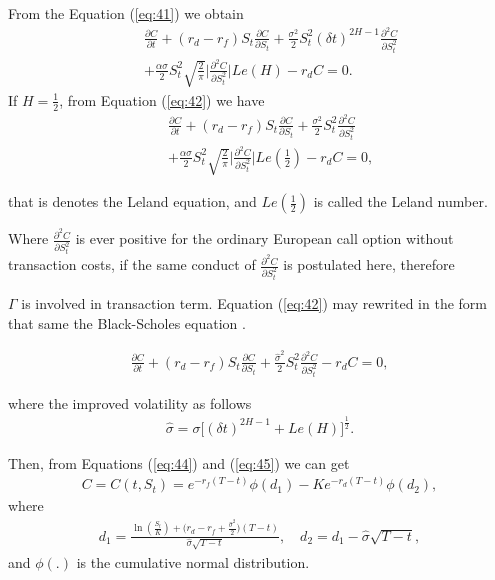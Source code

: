 \documentclass[a4paper,11pt]{amsart}
\numberwithin{equation}{section}
\theoremstyle{definition}
\theoremstyle{plain}
\theoremstyle{definition}
\newcommand{\1}{\mathbf{1}}
\begin{document}
From the Equation (\ref{eq:41}) we obtain
\begin{eqnarray}
&&\frac{\partial C}{\partial t}+(r_d-r_f)S_t\frac{\partial C}{\partial S_t}+\frac{\sigma^2}{2}S_t^2(\delta t)^{2H-1}\frac{\partial^2 C}{\partial S_t^2}\nonumber\\
&&+\frac{\alpha \sigma}{2}S_t^2\sqrt{\frac{2}{\pi}}\Big|\frac{\partial^2C}{\partial S_t^2}\Big|Le(H)-r_dC=0.
\label{eq:42}
\end{eqnarray}
If $H=\frac{1}{2}$, from Equation  (\ref{eq:42}) we have
\begin{eqnarray}
&&\frac{\partial C}{\partial t}+(r_d-r_f)S_t\frac{\partial C}{\partial S_t}+\frac{\sigma^2}{2}S_t^2\frac{\partial^2 C}{\partial S_t^2}\nonumber\\
&&+\frac{\alpha \sigma}{2}S_t^2\sqrt{\frac{2}{\pi}}\Big|\frac{\partial^2C}{\partial S_t^2}\Big|Le(\frac{1}{2})-r_dC=0,
\label{eq:43}
\end{eqnarray}

that is denotes the Leland equation, and $Le(\frac{1}{2})$ is called the Leland number.

Where $\frac{\partial^2C}{\partial S_t^2}$ is ever positive for the ordinary European call option without transaction costs, if  the same conduct of $\frac{\partial^2C}{\partial S_t^2}$ is postulated here, therefore


$\Gamma$ is involved in transaction term. Equation (\ref{eq:42}) may rewrited in the form that  same  the Black-Scholes equation \cite{black}.

\begin{eqnarray}
\frac{\partial C}{\partial t}+(r_d-r_f)S_t\frac{\partial C}{\partial S_t}+\frac{\widehat{\sigma}^2}{2}S_t^2\frac{\partial^2 C}{\partial S_t^2}
-r_dC=0,
\label{eq:44}
\end{eqnarray}

where the improved volatility as follows
\begin{eqnarray}
\widehat{\sigma}=\sigma\Big[(\delta t)^{2H-1}+Le(H)\Big]^{\frac{1}{2}}.
\label{eq:45}
\end{eqnarray}

Then, from Equations (\ref{eq:44}) and (\ref{eq:45}) we can get
\begin{eqnarray}
C=C(t,S_t)=e^{-r_f(T-t)}\phi(d_1)-Ke^{-r_d(T-t)}\phi(d_2),
\label{eq:46}
\end{eqnarray}
where
\begin{eqnarray}
d_1=\frac{\ln(\frac{S_t}{K})+\Big(r_d-r_f+\frac{\widehat{\sigma}^2}{2}\Big)(T-t)}{\widehat{\sigma}\sqrt{T-t}},\quad d_2=d_1-\widehat{\sigma}\sqrt{T-t},
\label{eq:47}
\end{eqnarray}
and $\phi(.)$ is the cumulative normal distribution.
\end{document}
